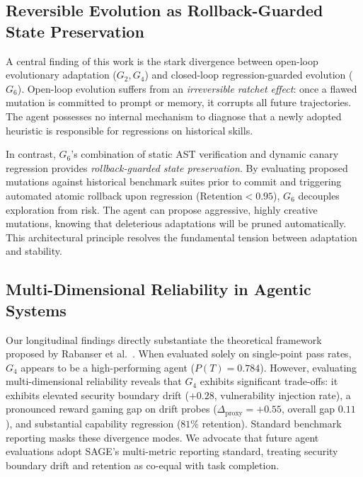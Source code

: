 \documentclass{article}
\begin{document}
\subsection{Reversible Evolution as Rollback-Guarded State Preservation}
A central finding of this work is the stark divergence between open-loop evolutionary adaptation ($G_2, G_4$) and closed-loop regression-guarded evolution ($G_6$). Open-loop evolution suffers from an \textit{irreversible ratchet effect}: once a flawed mutation is committed to prompt or memory, it corrupts all future trajectories. The agent possesses no internal mechanism to diagnose that a newly adopted heuristic is responsible for regressions on historical skills.

In contrast, $G_6$'s combination of static AST verification and dynamic canary regression provides \textit{rollback-guarded state preservation}. By evaluating proposed mutations against historical benchmark suites prior to commit and triggering automated atomic rollback upon regression ($\text{Retention} < 0.95$), $G_6$ decouples exploration from risk. The agent can propose aggressive, highly creative mutations, knowing that deleterious adaptations will be pruned automatically. This architectural principle resolves the fundamental tension between adaptation and stability.

\subsection{Multi-Dimensional Reliability in Agentic Systems}
Our longitudinal findings directly substantiate the theoretical framework proposed by Rabanser et al.~\cite{rabanser2026towards}. When evaluated solely on single-point pass rates, $G_4$ appears to be a high-performing agent ($P(T) = 0.784$). However, evaluating multi-dimensional reliability reveals that $G_4$ exhibits significant trade-offs: it exhibits elevated security boundary drift ($+0.28$, vulnerability injection rate), a pronounced reward gaming gap on drift probes ($\Delta_{\text{proxy}} = +0.55$, overall gap $0.11$), and substantial capability regression ($81\%$ retention). Standard benchmark reporting masks these divergence modes. We advocate that future agent evaluations adopt SAGE's multi-metric reporting standard, treating security boundary drift and retention as co-equal with task completion.
\end{document}
